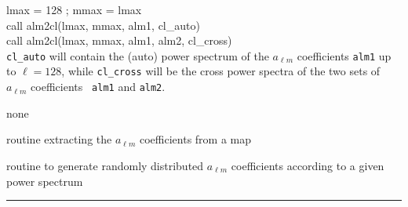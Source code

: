 \begin{example}
{
lmax = 128 ; mmax = lmax \\
call alm2cl(lmax, mmax, alm1, cl\_auto)  \\
call alm2cl(lmax, mmax, alm1, alm2, cl\_cross)  \\
}
{
{\tt cl\_auto} will contain the (auto) power spectrum of the $a_{\ell m}$ coefficients {\tt alm1} up to $\ell = 128$,
while {\tt cl\_cross} will be the cross power spectra of the two sets of $a_{\ell m}$ coefficients {\tt
  alm1} and {\tt alm2}.
}
\end{example}

\begin{modules}
  \begin{sulist}{} %
  \item[none]
  \end{sulist}
\end{modules}

\begin{related}
  \begin{sulist}{} %
  \item[\htmlref{map2alm}{sub:map2alm}] routine extracting the $a_{\ell m}$
  coefficients from a \healpix map
  \item[\htmlref{create\_alm}{sub:create_alm}] routine to generate randomly
  distributed $a_{\ell m}$ coefficients according to a given power spectrum
  \end{sulist}
\end{related}

\rule{\hsize}{2mm}

\newpage
